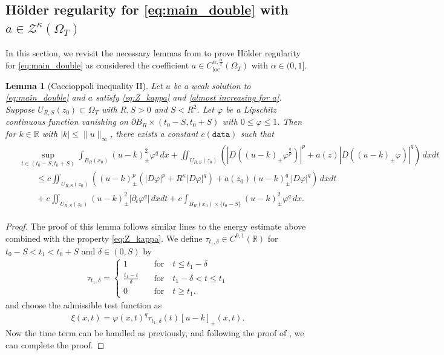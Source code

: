 \documentclass[10pt,a4paper]{amsart}
\newtheorem{lemma}[theorem]{Lemma}
\numberwithin{equation}{section}
\newcommand{\RR}{\mathds{R}}
\begin{document}
\subsection{H\"older regularity for \eqref{eq:main_double} with $a\in \mathcal{Z}^{\kappa}(\Omega_T)$} In this section, we revisit the necessary lemmas from \cite{Kim2025holder} to prove H\"older regularity for \eqref{eq:main_double} as \cite{Kim2025holder} considered the coefficient $a \in C^{\alpha, \frac{\alpha}{2}}_{\mathrm{loc}}(\Omega_T)$ with $\alpha \in (0, 1].$
\begin{lemma}[Caccioppoli inequality II]\label{Caccio 1}
Let $u$ be a weak solution to \eqref{eq:main_double} and $a$ satisfy \eqref{eq:Z_kappa} and \eqref{almost increasing for a}. Suppose $U_{R, S}(z_0)\subset\Omega_T$ with $R,S>0$ and $S<R^2$. Let $\varphi$ be a Lipschitz continuous function vanishing on $\partial B_R \times (t_0-S,t_0+S)$ with $0\le \varphi\le 1$. 
Then for $k \in \RR$ with $|k| \leq \|u\|_\infty$, there exists a constant $c(\texttt{data})$ such that
	\begin{align*}
		\begin{split}
			& \sup_{t\in (t_0-S,t_0+S)}\int_{B_{R}(x_0)}  (u-k)_{\pm}^2\varphi^q\, dx 
            + \iint_{U_{R,S}(z_0)} (|D ((u-k)_\pm\varphi^\frac{q}{p})|^p+a(z)|D ((u-k)_\pm\varphi)|^q)\, dx dt  \\
			&\qquad\le c\iint_{U_{R,S}(z_0)} ((u-k)_\pm^p (|D \varphi|^p+R^\kappa |D \varphi|^{q} ) +a(z_0)(u-k)_\pm^q |D \varphi|^q )\, dx dt\\
			&\qquad+c\iint_{U_{R,S}(z_0)} (u-k)_\pm^2 |\partial_t \varphi^q| \, dx dt + c\int_{B_R(x_0) \times \{t_0-S\}}  (u-k)_\pm^2\varphi^q \, dx.
		\end{split}
	\end{align*}
\end{lemma}
\begin{proof}
The proof of this lemma follows similar lines to the energy estimate above combined with the property \eqref{eq:Z_kappa}. We define $\tau_{t_1, \delta} \in C^{0, 1}(\RR)$ for $t_0-S<t_1<t_0+S$ and $\delta \in (0, S)$ by 
\begin{align*}
    \tau_{t_1, \delta}=\begin{cases}
        1\quad &\text{for} \quad t \leq t_1-\delta\\
        \frac{t_1-t}{\delta}\quad &\text{for} \quad t_1-\delta<t\leq t_1\\
        0\quad &\text{for} \quad t \geq t_1.
    \end{cases}
\end{align*}
and choose the admissible test function as 
\begin{align*}
    \xi(x, t)=\varphi(x, t)^q\tau_{t_1, \delta}(t)[u-k]_{\pm}(x, t).
\end{align*}
Now the time term can be handled as previously, and following the proof of \cite[Lemma 3.1]{Kim2025holder}, we can complete the proof.
\end{proof}
\end{document}

